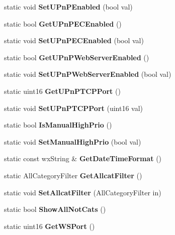 \begin{DoxyCompactItemize}
\item 
static void {\bfseries SetUPnPEnabled} (bool val)\label{classCPreferences_a0bdda406d9f5587e48a0ae1a75584fea}

\item 
static bool {\bfseries GetUPnPECEnabled} ()\label{classCPreferences_ad226d33310c184980339c674f08be4b9}

\item 
static void {\bfseries SetUPnPECEnabled} (bool val)\label{classCPreferences_aae2b68dc96b72b3edafaba5135746c7a}

\item 
static bool {\bfseries GetUPnPWebServerEnabled} ()\label{classCPreferences_a1b4f5ca36979fe487f38f885543cd057}

\item 
static void {\bfseries SetUPnPWebServerEnabled} (bool val)\label{classCPreferences_a0aedd7ce60dc8703c56ce8fb58513e41}

\item 
static uint16 {\bfseries GetUPnPTCPPort} ()\label{classCPreferences_aa3129566ef98eb2634cd672d1389178e}

\item 
static void {\bfseries SetUPnPTCPPort} (uint16 val)\label{classCPreferences_a7eff52fcd557670440c916b06e90ad46}

\item 
static bool {\bfseries IsManualHighPrio} ()\label{classCPreferences_a368ba35d9625dbfc6d0bf860dc726cdf}

\item 
static void {\bfseries SetManualHighPrio} (bool val)\label{classCPreferences_af0cc72a23a65e756b8118247ac71bc5f}

\item 
static const wxString \& {\bfseries GetDateTimeFormat} ()\label{classCPreferences_aa9fc1de74d95e77ec0bd6afa3a706ed8}

\item 
static AllCategoryFilter {\bfseries GetAllcatFilter} ()\label{classCPreferences_ac044a6fe68108da80b36fee9f71678e5}

\item 
static void {\bfseries SetAllcatFilter} (AllCategoryFilter in)\label{classCPreferences_aaed05ec6636438c23b289eecf2781e87}

\item 
static bool {\bfseries ShowAllNotCats} ()\label{classCPreferences_ae691b188e634b9ae4936cb1a30afbf7d}

\item 
static uint16 {\bfseries GetWSPort} ()\label{classCPreferences_a3f5f1eb73346838ab4d849b3ced46970}


\end{DoxyCompactItemize}
